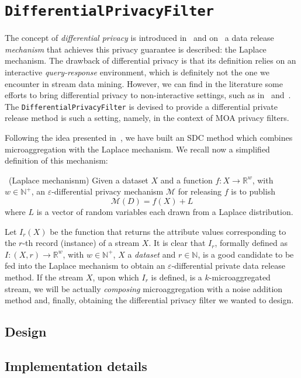\section{\texttt{DifferentialPrivacyFilter}}
\label{Implementation:DifferentialPrivacy}

The concept of \textit{differential privacy} is introduced in~ and on~ a data release \textit{mechanism} that achieves this privacy guarantee is described: the Laplace mechanism. The drawback of differential privacy is that its definition relies on an interactive \textit{query-response} environment, which is definitely not the one we encounter in stream data mining. However, we can find in the literature some efforts to bring differential privacy to non-interactive settings, such as in~\citet{Leoni:NonInteractiveDiffPriv} and~\citet{Domingo:EnhancingDiffPrivMicroaggregation}. The \texttt{DifferentialPrivacyFilter} is devised to provide a differential private release method is such a setting, namely, in the context of MOA privacy filters.

Following the idea presented in~\citet{Domingo:EnhancingDiffPrivMicroaggregation}, we have built an SDC method which combines microaggregation with the Laplace mechanism. We recall now a simplified definition of this mechanism:

\begin{definition}~(Laplace mechanisnm)
Given a dataset $X$ and a function $f : X \rightarrow \mathbb{R}^w$, with $w \in \mathbb{N}^+$, an $\varepsilon$-differential privacy mechanism $\mathcal{M}$ for releasing $f$ is to publish
\begin{equation*}
\mathcal{M}(D) = f(X) + L
\end{equation*}
where $L$ is a vector of random variables each drawn from a Laplace distribution.
\end{definition}

Let $I_r(X)$ be the function that returns the attribute values corresponding to the $r$-th record (instance) of a stream $X$. It is clear that $I_r$, formally defined as $I : (X,r) \rightarrow \mathbb{R}^w$, with $w \in \mathbb{N}^+$, $X$ a \textit{dataset} and $r \in \mathbb{N}$, is a good candidate to be fed into the Laplace mechanism to obtain an $\varepsilon$-differential private data release method. If the stream $X$, upon which $I_r$ is defined, is a $k$-microaggregated stream, we will be actually \textit{composing} microaggregation with a noise addition method and, finally, obtaining the differential privacy filter we wanted to design.

\subsection{Design}
\label{Implementation:DifferentialPrivacy:Design}

\subsection{Implementation details}
\label{Implementation:DifferentialPrivacy:Details}
